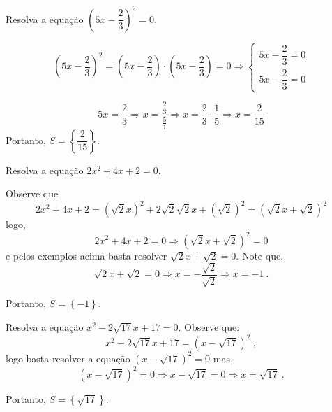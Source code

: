  \begin{exem}
  Resolva a equação $\left(5x - \dfrac{2}{3} \right)^2= 0$.

\[\left(5x - \dfrac{2}{3} \right)^2= \left(5x - \dfrac{2}{3} \right) \cdot \left(5x - \dfrac{2}{3} \right)= 0 \Rightarrow
\begin{cases}
 5x - \dfrac{2}{3}= 0  \\
 5x - \dfrac{2}{3}= 0
\end{cases} \]

\begin{equation}
5x= \dfrac{2}{3} \Rightarrow x= \dfrac{\frac{2}{3}}{\frac{5}{1}} \Rightarrow x= \dfrac{2}{3} \cdot \dfrac{1}{5} \Rightarrow x= \dfrac{2}{15}
\end{equation}
Portanto, $S= \left\{ \dfrac{2}{15} \right\}$.
 \end{exem}

 \begin{exem}
  Resolva a equação $2x^2 + 4x + 2=0$.

 Observe que
\begin{equation}
2x^2 + 4x + 2= (\sqrt{2}x)^2 + 2 \sqrt{2}\sqrt{2}x + (\sqrt{2})^2= (\sqrt{2}x + \sqrt{2})^2
\end{equation}
 logo,
\begin{equation}
2x^2 + 4x + 2=0 \Rightarrow (\sqrt{2}x + \sqrt{2})^2= 0
\end{equation}
 e pelos exemplos acima basta resolver $\sqrt{2}x + \sqrt{2}= 0$. Note que,
\begin{equation}
\sqrt{2}x + \sqrt{2} =0 \Rightarrow x= - \dfrac{\sqrt{2}}{\sqrt{2}} \Rightarrow x= -1 \ .
\end{equation}

Portanto, $S= \left\{ -1 \right\}$.
 \end{exem}

 \begin{exem}
 Resolva a equação $x^2 - 2\sqrt{17}x + 17=0$.
Observe que:
\begin{equation}
x^2 - 2\sqrt{17}x + 17= (x - \sqrt{17})^2 \ ,
\end{equation}
logo basta resolver a equação $(x - \sqrt{17})^2= 0$ mas,
\begin{equation}
(x - \sqrt{17})^2= 0 \Rightarrow x - \sqrt{17}= 0 \Rightarrow x= \sqrt{17} \ .
\end{equation}

Portanto, $S= \left\{ \sqrt{17}  \right\}$.
 \end{exem}

